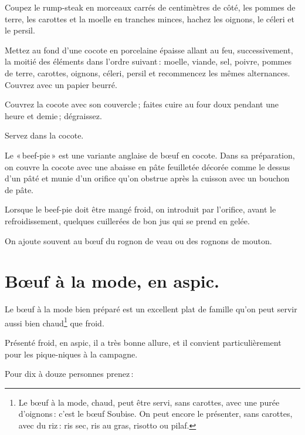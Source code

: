 Coupez le rump-steak en morceaux carrés de {\mmm} centimètres de côté, les
pommes de terre, les carottes et la moelle en tranches minces, hachez les
oignons, le céleri et le persil.

Mettez au fond d'une cocote en porcelaine épaisse allant au feu,
successivement, la moitié des éléments dans l'ordre suivant : moelle, viande,
sel, poivre, pommes de terre, carottes, oignons, céleri, persil et recommencez
les mêmes alternances. Couvrez avec un papier beurré.

Couvrez la cocote avec son couvercle ; faites cuire au four doux pendant une
heure et demie ; dégraissez.

Servez dans la cocote.

\sk

\label{pg0471} \hypertarget{p0471}{}
Le « beef-pie » est une variante anglaise de bœuf en cocote. Dans sa
préparation, on couvre la cocote avec une abaisse en pâte feuilletée décorée
comme le dessus d’un pâté et munie d'un orifice qu'on obstrue après la cuisson
avec un bouchon de pâte.

Lorsque le beef-pie doit être mangé froid, on introduit par l'orifice, avant le
refroidissement, quelques cuillerées de bon jus qui se prend en gelée.

On ajoute souvent au bœuf du rognon de veau ou des rognons de mouton.

\section*{\centering Bœuf à la mode, en aspic.}
{}

Le bœuf à la mode bien préparé est un excellent plat de famille qu'on peut
servir aussi bien chaud\footnote{Le bœuf à la mode, chaud, peut être servi,
sans carottes, avec une purée d'oignons : c'est le bœuf Soubise.
\protect\endgraf
{}
On peut encore le présenter, sans carottes, avec du riz : ris sec, ris au gras,
risotto ou pilaf.} que froid.

Présenté froid, en aspic, il a très bonne allure, et il convient
particulièrement pour les pique-niques à la campagne.

\medskip

Pour dix à douze personnes prenez :

